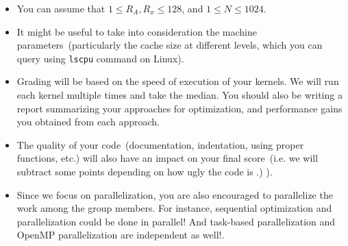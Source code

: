\documentclass{article}
\begin{document}
\begin{itemize}

\item You can assume that $1 \le R_A, R_x \le 128$, and $1 \le N \le 1024$.

\item It might be useful to take into consideration the machine parameters~(particularly the cache size at different levels, which you can query using \texttt{lscpu} command on Linux).

\item Grading will be based on the speed of execution of your kernels.
We will run each kernel multiple times and take the median.
You should also be writing a report summarizing your approaches for optimization, and performance gains you obtained from each approach.

\item The quality of your code~(documentation, indentation, using proper functions, etc.) will also have an impact on your final score~(i.e. we will subtract some points depending on how ugly the code is .) ).

\item Since we focus on parallelization, you are also encouraged to parallelize the work among the group members.
For instance, sequential optimization and parallelization could be done in parallel!
And task-based parallelization and OpenMP parallelization are independent as well!.

\end{itemize}
\end{document}
